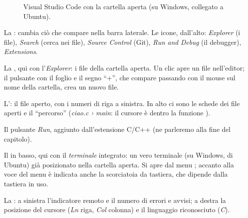 \begin{figure}[H]
  \caption{Visual Studio Code con la cartella  aperta
           (su Windows, collegato a Ubuntu).}
  \label{fig:vscode}
\end{figure}

\begin{passi}
  \item La : cambia ciò che compare nella barra
        laterale. Le icone, dall'alto: \textit{Explorer} (i file),
        \textit{Search} (cerca nei file), \textit{Source Control} (Git),
        \textit{Run and Debug} (il debugger), \textit{Extensions}.
  \item La , qui con l'\textit{Explorer}: i file della
        cartella aperta. Un clic apre un file nell'editor; il pulsante con
        il foglio e il segno “+”, che compare passando con il mouse sul
        nome della cartella, crea un nuovo file.
  \item L': il file aperto, con i numeri di riga a sinistra. In
        alto ci sono le schede dei file aperti e il “percorso” (\textit{ciao.c
        › main}: il cursore è dentro la funzione ).
  \item Il pulsante \textit{Run}, aggiunto dall'estensione C/C++ (ne
        parleremo alla fine del capitolo).
  \item Il  in basso, qui con il \textit{terminale}
        integrato: un vero terminale (su Windows, di Ubuntu) già posizionato
        nella cartella aperta. Si apre dal menu ; accanto alla voce del menu è indicata anche la
        scorciatoia da tastiera, che dipende dalla tastiera in uso.
  \item La : a sinistra l'indicatore remoto e il
        numero di errori e avvisi; a destra la posizione del cursore
        (\textit{Ln} riga, \textit{Col} colonna) e il linguaggio
        riconosciuto (\textit{C}).
\end{passi}

